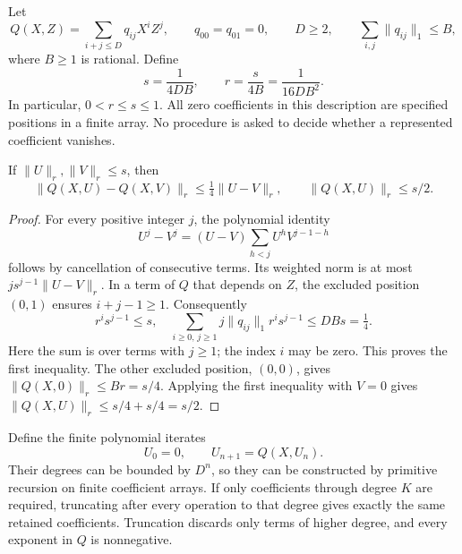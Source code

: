 Let
\[
 Q(X,Z)=\sum_{i+j\leq D}q_{ij}X^iZ^j,
 \qquad q_{00}=q_{01}=0,
 \qquad D\geq2,
 \qquad \sum_{i,j}\lVert q_{ij}\rVert_1\leq B,
\]
where \(B\geq1\) is rational. Define
\[
 s=\frac{1}{4DB},\qquad
 r=\frac{s}{4B}=\frac{1}{16DB^2}.
 \tag{A2}\label{eq:branch-radii}
\]
In particular, \(0<r\leq s\leq1\). All zero coefficients in this
description are specified positions in a finite array. No procedure is
asked to decide whether a represented coefficient vanishes.

\begin{lemma}
\label{lem:finite-poly-contraction}
If \(\lVert U\rVert_r,\lVert V\rVert_r\leq s\), then
\[
 \lVert Q(X,U)-Q(X,V)\rVert_r
       \leq\tfrac14\lVert U-V\rVert_r,
 \qquad
 \lVert Q(X,U)\rVert_r\leq s/2.
 \tag{A3}\label{eq:finite-poly-contraction}
\]
\end{lemma}
\begin{proof}
For every positive integer \(j\), the polynomial identity
\[
 U^j-V^j=(U-V)\sum_{h<j}U^hV^{j-1-h}
\]
follows by cancellation of consecutive terms. Its weighted norm is at
most \(j s^{j-1}\lVert U-V\rVert_r\). In a term of \(Q\) that depends
on \(Z\), the excluded position \((0,1)\) ensures
\(i+j-1\geq1\). Consequently
\[
 r^i s^{j-1}\leq s,
 \quad
 \sum_{i\geq0,\,j\geq1}j\lVert q_{ij}\rVert_1r^i s^{j-1}
 \leq DBs=\tfrac14.
\]
Here the sum is over terms with \(j\geq1\); the index \(i\) may be
zero. This proves the first inequality. The other excluded position,
\((0,0)\), gives
\(\lVert Q(X,0)\rVert_r\leq Br=s/4\). Applying the first inequality
with \(V=0\) gives
\(\lVert Q(X,U)\rVert_r\leq s/4+s/4=s/2\).
\end{proof}

Define the finite polynomial iterates
\[
 U_0=0,\qquad U_{n+1}=Q(X,U_n).
 \tag{A4}\label{eq:finite-iterates}
\]
Their degrees can be bounded by \(D^n\), so they can be constructed by
primitive recursion on finite coefficient arrays. If only coefficients
through degree \(K\) are required, truncating after every operation to
that degree gives exactly the same retained coefficients. Truncation
discards only terms of higher degree, and every exponent in \(Q\) is
nonnegative.

